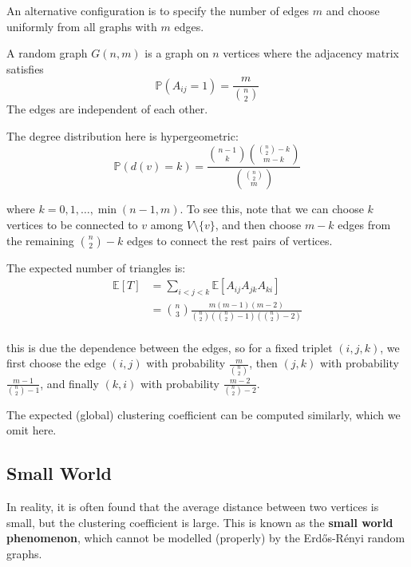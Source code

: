 \documentclass{article}
\begin{document}
An alternative configuration is to specify the number of edges $m$ and choose uniformly from all graphs with $m$ edges. 

\begin{definition}
    A random graph $G(n,m)$ is a graph on $n$ vertices where the adjacency matrix satisfies
    \begin{equation*}
        \mathbb{P}(A_{ij}=1)=\frac{m}{\binom{n}{2}}
    \end{equation*}
    The edges are independent of each other.
\end{definition}

The degree distribution here is hypergeometric:
$$
\mathbb{P}(d(v)=k)=\frac{\binom{n-1}{k}\binom{\binom{n}{2}-k}{m-k}}{\binom{\binom{n}{2}}{m}}
$$

where $k=0,1,\ldots,\min(n-1,m)$. To see this, note that we can choose $k$ vertices to be connected to $v$ among $V\setminus \{v\}$, and then choose $m-k$ edges from the remaining $\binom{n}{2}-k$ edges to connect the rest pairs of vertices. 

The expected number of triangles is:
\begin{align*}
    \mathbb{E}[T]&=\sum_{i<j<k} \mathbb{E}[A_{ij}A_{jk}A_{ki}]\\
    &=\binom{n}{3}\frac{m(m-1)(m-2)}{\binom{n}{2}\left(\binom{n}{2}-1\right)\left(\binom{n}{2}-2\right)}\\
\end{align*}

this is due the dependence between the edges, so for a fixed triplet $(i,j,k)$, we first choose the edge $(i,j)$ with probability $\frac{m}{\binom{n}{2}}$, then $(j,k)$ with probability $\frac{m-1}{\binom{n}{2}-1}$, and finally $(k,i)$ with probability $\frac{m-2}{\binom{n}{2}-2}$.  

The expected (global) clustering coefficient can be computed similarly, which we omit here.  

\subsection{Small World}

In reality, it is often found that the average distance between two vertices is small, but the clustering coefficient is large. This is known as the \textbf{small world phenomenon}, which cannot be modelled (properly) by the Erd\H{o}s-R\'{e}nyi random graphs.  
\end{document}
